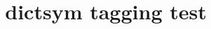 \documentclass{article}
\title{dictsym tagging test}
\begin{document}
\dsarchitectural
\dsbiological
\dschemical
\dsagricultural
\dsheraldical
\dsjuridical
\dsliterary
\dsmathematical
\dsrailways
\dstechnical
\dsmilitary
\dsaeronautical
\dscommercial
\dsmedical
\end{document}
